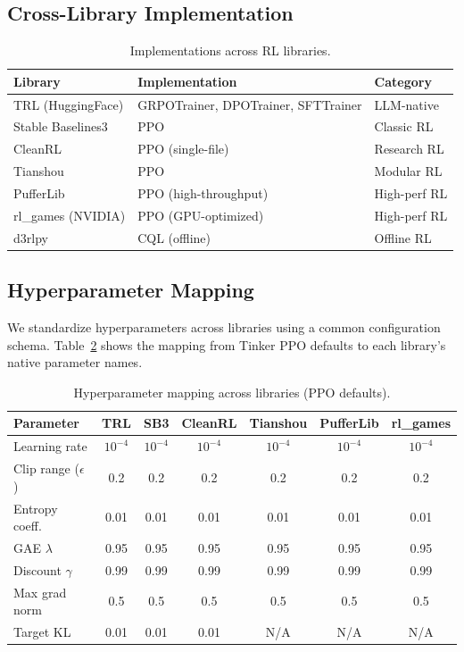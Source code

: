\documentclass{article}
\begin{document}
\subsection{Cross-Library Implementation}

\begin{table}[htbp]
\centering
\caption{Implementations across RL libraries.}
\label{tab:implementations}
\begin{tabular}{lll}
\toprule
\textbf{Library} & \textbf{Implementation} & \textbf{Category} \\
\midrule
TRL (HuggingFace) & GRPOTrainer, DPOTrainer, SFTTrainer & LLM-native \\
Stable Baselines3 & PPO & Classic RL \\
CleanRL & PPO (single-file) & Research RL \\
Tianshou & PPO & Modular RL \\
PufferLib & PPO (high-throughput) & High-perf RL \\
rl\_games (NVIDIA) & PPO (GPU-optimized) & High-perf RL \\
d3rlpy & CQL (offline) & Offline RL \\
\bottomrule
\end{tabular}
\end{table}

\subsection{Hyperparameter Mapping}

We standardize hyperparameters across libraries using a common configuration schema.
Table~\ref{tab:hyperparams} shows the mapping from Tinker PPO defaults to each library's
native parameter names.

\begin{table}[htbp]
\centering
\caption{Hyperparameter mapping across libraries (PPO defaults).}
\label{tab:hyperparams}
\begin{tabular}{lcccccc}
\toprule
\textbf{Parameter} & \textbf{TRL} & \textbf{SB3} & \textbf{CleanRL} & \textbf{Tianshou} & \textbf{PufferLib} & \textbf{rl\_games} \\
\midrule
Learning rate & $10^{-4}$ & $10^{-4}$ & $10^{-4}$ & $10^{-4}$ & $10^{-4}$ & $10^{-4}$ \\
Clip range ($\epsilon$) & 0.2 & 0.2 & 0.2 & 0.2 & 0.2 & 0.2 \\
Entropy coeff. & 0.01 & 0.01 & 0.01 & 0.01 & 0.01 & 0.01 \\
GAE $\lambda$ & 0.95 & 0.95 & 0.95 & 0.95 & 0.95 & 0.95 \\
Discount $\gamma$ & 0.99 & 0.99 & 0.99 & 0.99 & 0.99 & 0.99 \\
Max grad norm & 0.5 & 0.5 & 0.5 & 0.5 & 0.5 & 0.5 \\
Target KL & 0.01 & 0.01 & 0.01 & N/A & N/A & N/A \\
\bottomrule
\end{tabular}
\end{table}
\end{document}
